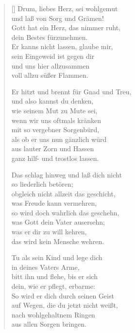 \begin{multicols}{2}
\begin{verse}[\versewidth]
 Drum, liebes Herz, sei wohlgemut\\
und laß von Sorg und Grämen!\\
Gott hat ein Herz, das nimmer ruht,\\
dein Bestes fürzunehmen.\\
Er kanns nicht lassen, glaube mir,\\
sein Eingeweid ist gegen dir\\
und uns hier allzusammen\\
voll allzu süßer Flammen.

 Er hitzt und brennt für Gnad und Treu,\\
und also kannst du denken,\\
wie seinem Mut zu Mute sei,\\
wenn wir uns oftmals kränken\\
mit so vergebner Sorgenbürd,\\
als ob er uns nun gänzlich würd\\
aus lauter Zorn und Hassen\\
ganz hilf- und trostlos lassen.

 Das schlag hinweg und laß dich nicht\\
so liederlich betören;\\
obgleich nicht allzeit das geschicht,\\
was Freude kann vermehren,\\
so wird doch wahrlich das geschehn,\\
was Gott dein Vater ausersehn;\\
was er dir zu will kehren,\\
das wird kein Mensche wehren.

 Tu als sein Kind und lege dich\\
in deines Vaters Arme,\\
bitt ihn und flehe, bis er sich\\
dein, wie er pflegt, erbarme:\\
So wird er dich durch seinen Geist\\
auf Wegen, die du jetzt nicht weißt,\\
nach wohlgehaltnem Ringen\\
aus allen Sorgen bringen.

\end{verse}
\end{multicols}
